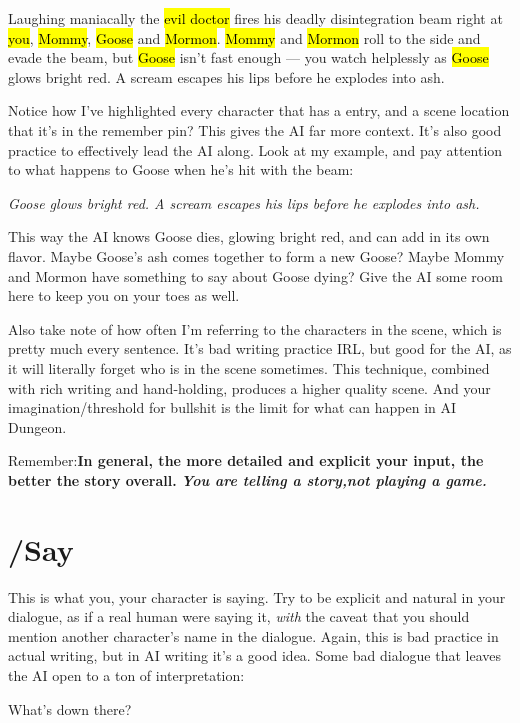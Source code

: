 \documentclass[Avsfag-main.tex]{subfiles}
\begin{document}
\begin{storyb}
	\story Laughing maniacally the \hl{evil doctor} fires his deadly disintegration beam right at \hl{you}, \hl{Mommy}, \hl{Goose} and \hl{Mormon}.
	\hl{Mommy} and \hl{Mormon} roll to the side and evade the beam, but \hl{Goose} isn't fast enough — you watch helplessly as \hl{Goose} glows bright red.
	A scream escapes his lips before he explodes into ash.
\end{storyb}

Notice how I've highlighted every character that has a \wi entry, and a scene location that it's in the remember pin?
This gives the AI far more context.
It's also good practice to effectively lead the AI along.
Look at my \story example, and pay attention to what happens to Goose when he's hit with the beam:

\emph{Goose glows bright red. A scream escapes his lips before he explodes into ash.}

This way the AI knows Goose dies, glowing bright red, and can add in its own flavor.
Maybe Goose's ash comes together to form a new Goose?
Maybe Mommy and Mormon have something to say about Goose dying?
Give the AI some room here to keep you on your toes as well.

Also take note of how often I'm referring to the characters in the scene, which is pretty much every sentence.
It's bad writing practice IRL, but good for the AI, as it will literally forget who is in the scene sometimes.
This technique, combined with rich writing and hand-holding, produces a higher quality scene. 
And your imagination/threshold for bullshit is the limit for what can happen in AI Dungeon.

Remember:\textbf{In general, the more detailed and explicit your input, the better the story overall.}
\emph{\textbf{You are telling a story,not playing a game.}}

\section{/Say}

This is what you, your character is saying.
Try to be explicit and natural in your dialogue, as if a real human were saying it, \emph{with} the caveat that you should mention another character's name in the dialogue.
Again, this is bad practice in actual writing, but in AI writing it's a good idea.
Some bad dialogue that leaves the AI open to a ton of interpretation:

\begin{storyb}
	\say What's down there?
\end{storyb}
\end{document}
